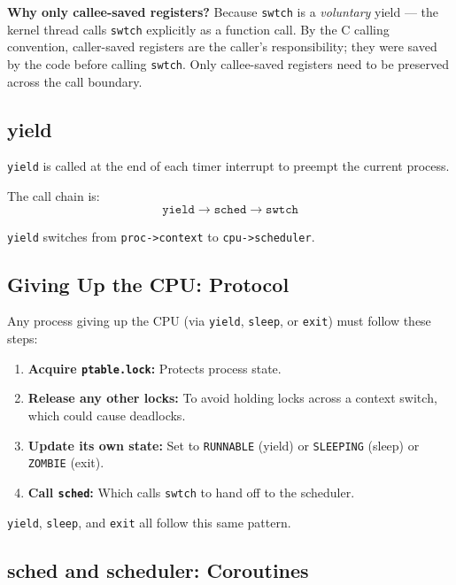 \documentclass[11pt]{article}
\begin{document}
\textbf{Why only callee-saved registers?} Because \texttt{swtch} is a \emph{voluntary} yield --- the kernel thread calls \texttt{swtch} explicitly as a function call. By the C calling convention, caller-saved registers are the caller's responsibility; they were saved by the code before calling \texttt{swtch}. Only callee-saved registers need to be preserved across the call boundary.

\subsection{yield}

\texttt{yield} is called at the end of each timer interrupt to preempt the current process.

The call chain is:
\[
\texttt{yield} \to \texttt{sched} \to \texttt{swtch}
\]

\texttt{yield} switches from \texttt{proc->context} to \texttt{cpu->scheduler}.

\subsection{Giving Up the CPU: Protocol}

Any process giving up the CPU (via \texttt{yield}, \texttt{sleep}, or \texttt{exit}) must follow these steps:

\begin{enumerate}
    \item \textbf{Acquire \texttt{ptable.lock}:} Protects process state.
    \item \textbf{Release any other locks:} To avoid holding locks across a context switch, which could cause deadlocks.
    \item \textbf{Update its own state:} Set to \texttt{RUNNABLE} (yield) or \texttt{SLEEPING} (sleep) or \texttt{ZOMBIE} (exit).
    \item \textbf{Call \texttt{sched}:} Which calls \texttt{swtch} to hand off to the scheduler.
\end{enumerate}

\texttt{yield}, \texttt{sleep}, and \texttt{exit} all follow this same pattern.

\subsection{sched and scheduler: Coroutines}
\end{document}
